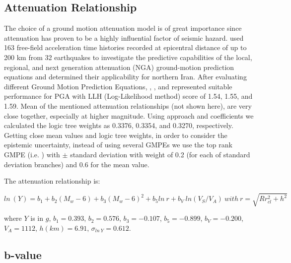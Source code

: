\subsection{Attenuation Relationship}
The choice of a ground motion attenuation model is of great importance since attenuation has proven to be a highly influential factor of seismic hazard. \citet{Zafarani2014} used 163 free-field acceleration time histories recorded at epicentral distance of up to 200 km from 32 earthquakes to investigate the predictive capabilities of the local, regional, and next generation attenuation (NGA) ground-motion prediction equations and determined their applicability for northern Iran. After evaluating different Ground Motion Prediction Equations, \citet{Kalkan2004}, \citet{Chiou2008}, and \citet{Boore2008} represented suitable performance for  PGA  with LLH (Log-Likelihood method) score of 1.54, 1.55, and 1.59. Mean of the mentioned attenuation relationships (not shown here), are very close together, especially at higher magnitude. Using \citet{Scherbaum2009} approach and \citet{Zafarani2014} coefficients we calculated the logic tree weights as 0.3376, 0.3354, and 0.3270, respectively. Getting close mean values and logic tree weights, in order to consider the epistemic uncertainty, instead of using several GMPEs we use the top rank GMPE (i.e.  \citet{Kalkan2004} ) with  $\pm$ standard deviation with weight of 0.2 (for each of standard deviation branches) and 0.6 for the mean value.    \\

\noindent

The attenuation relationship is:

\begin{equation}
ln\ (Y) = b_1 + b_2(M_w-6) + b_3( M_w-6)^{2}+ b_5ln\ r + b_V \ ln(V_S/V_A) \  with \  r= \sqrt{R{r^2_{cl} + h^2}}  
\end{equation}

where $Y$ is in $g$, $b_1 = 0.393$, $b_2 = 0.576$, $b_3 = -0.107$, $b_5 = -0.899$, $b_V = -0.200$, $V_A = 1112$, $h(km) = 6.91$, $\sigma_{ln\ Y} = 0.612$.

\subsection{b-value}

